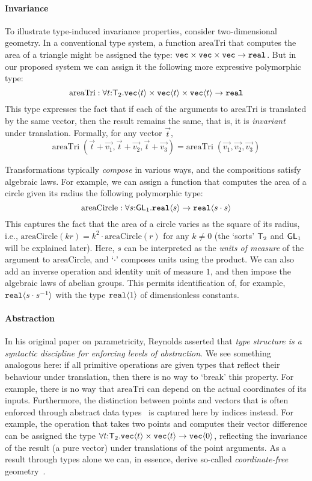 \paragraph{Invariance}
To illustrate type-induced invariance properties, consider
two-dimensional geometry. 
In a conventional type system, a function $\mathrm{areaTri}$ that computes the area of a triangle
might be assigned the type:
$\textup{\texttt{vec}}\times\textup{\texttt{vec}}\times\textup{\texttt{vec}}\to\texttt{real}$.
But in our proposed system we can assign it the following more expressive polymorphic
type:
\[
\mathrm{areaTri} : \forall t\mathord:\mathsf{T}_2.
  \textup{\texttt{vec}}\langle t \rangle \times \textup{\texttt{vec}}\langle t \rangle \times \textup{\texttt{vec}}\langle t \rangle \to \texttt{real} \\
\]
This type expresses the fact that if each of the arguments to $\mathrm{areaTri}$
is translated by the same vector, then the result remains the same,
that is, it is \emph{invariant} under translation. Formally, for any 
vector $\vec t$,
\[
\mathrm{areaTri}\;(\vec{t} + \vec{v_1}, \vec{t} + \vec{v_2}, \vec{t} + \vec{v_3}) = 
\mathrm{areaTri}\;(\vec{v_1}, \vec{v_2}, \vec{v_3})
\]

Transformations typically \emph{compose} in various
ways, and the compositions satisfy algebraic laws. For example, 
we can assign a function that computes the area of a circle given its
radius the following polymorphic type:
\[
\mathrm{areaCircle} : \forall s\mathord:\mathsf{GL}_1.\textup{\texttt{real}}\langle s \rangle\to
\textup{\texttt{real}}\langle s\cdot s \rangle
\]
This captures the fact that the area of a circle varies as the square
of its radius, i.e., $\mathrm{areaCircle}(k r) = k^2\cdot
\mathrm{areaCircle}(r)$ for any $k\neq 0$ (the `sorts' $\mathsf{T}_2$ and
$\mathsf{GL}_1$ will be explained later).  Here, $s$ 
can be interpreted as the \emph{units of measure} of the argument to
$\mathrm{areaCircle}$, and `$\cdot$' composes units using the
product. We can also add an inverse operation and identity unit of
measure $1$, and then impose the algebraic laws of abelian
groups. This permits identification of, for example,
$\textup{\texttt{real}}\langle s\cdot s^{-1} \rangle$ with the type
$\textup{\texttt{real}}\langle 1 \rangle$ of dimensionless constants.

\paragraph{Abstraction}
In his original paper on parametricity, Reynolds asserted that
\emph{type structure is a syntactic discipline for enforcing levels of
  abstraction}.  We see something analogous here: if all primitive
operations are given types that reflect their behaviour under
translation, then there is no way to `break' this property. For
example, there is no way that $\mathrm{areaTri}$ can depend on the
actual coordinates of its inputs. Furthermore, the distinction between
points and vectors that is often enforced through abstract data
types~\cite{CGAL} is captured here by indices instead. For example,
the operation that takes two points and computes their vector
difference can be assigned the type
$\forall t\mathord:\mathsf{T}_2.\textup{\texttt{vec}}\langle t \rangle\times\textup{\texttt{vec}}\langle t \rangle\to\textup{\texttt{vec}}\langle 0 \rangle$,
reflecting the invariance of the result (a pure vector) under
translations of the point arguments. As a result through types alone
we can, in essence, derive so-called \emph{coordinate-free}
geometry~\cite{CFGADT}.

